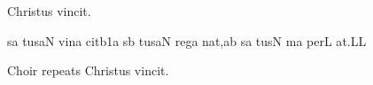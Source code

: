 
\beginhymn Christus vincit.

\def\cantores{\cchar{7}{\smallit Schola}}
\def\chorus{\cchar{7}{\smallit Choir}}
\def\omnes{\cchar{7}{\smallit All}}

\Internote
{}
\initiumgregorianum
{}%
s\punctum a\egn
\sgn tus\clivis aN\egn
\spatium
\sgn v{i}n\punctum a\egn
\sgn cit\episem b1\punctum a\egn
\spatium
\divisiominima
\spatium
{}s\punctum b\egn
\sgn tus\clivis aN\egn
\spatium
\sgn r{e}g\punctum a\egn
\sgn na{t,}\punctum a\augmentum b\egn
\spatium
\divisiominima
\spatium
{}s\punctum a\egn
\sgn tus\punctum N\egn
\spatium
\sgn {}{\'\i}m\punctum a\egn
\sgn per\punctum L\egn
\sgn {}a{t.}\punctum L\augmentum L\egn
\spatium
\Finisgregoriana



\bigskip

\itlyrics Choir repeats \rm Christus vincit.

\bigskip


